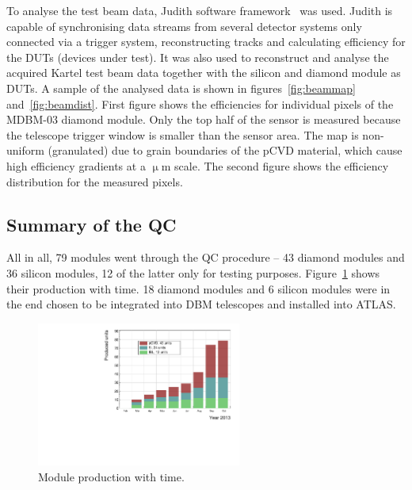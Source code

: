 To analyse the test beam data, Judith software framework~\cite{McGoldrick:1982209} was used. Judith is capable of synchronising data streams from several detector systems only connected via a trigger system, reconstructing tracks and calculating efficiency for the DUTs (devices under test). It was also used to reconstruct and analyse the acquired Kartel test beam data together with the silicon and diamond module as DUTs. A sample of the analysed data is shown in figures~\ref{fig:beammap} and~\ref{fig:beamdist}. First figure shows the efficiencies for individual pixels of the MDBM-03 diamond module. Only the top half of the sensor is measured because the telescope trigger window is smaller than the sensor area. The map is non-uniform (granulated) due to grain boundaries of the pCVD material, which cause high efficiency gradients at a $\upmu$m scale. The second figure shows the efficiency distribution for the measured pixels.





\subsection{Summary of the QC}
All in all, 79 modules went through the QC procedure -- 43 diamond modules and 36 silicon modules, 12 of the latter only for testing purposes. Figure~\ref{fig:production} shows their production with time. 18 diamond modules and 6 silicon modules were in the end chosen to be integrated into DBM telescopes and installed into ATLAS.


\begin{figure}[!t]
\centering
\includegraphics[width=0.6\textwidth]{../scripts/04_charge_monitoring/plots/production1}
\caption{Module production with time.}
\label{fig:production}
\end{figure}







